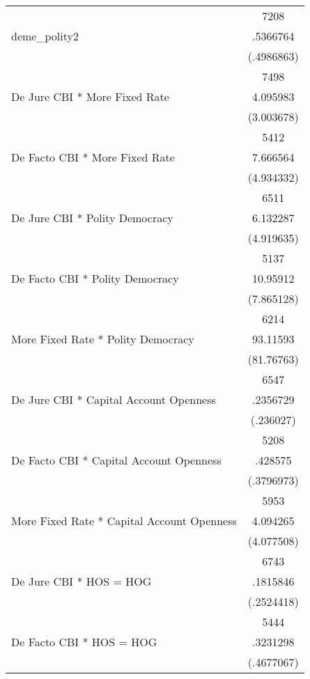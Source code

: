 {\begin{longtable}{l*{1}{c}}
                    &        7208\\
deme\_polity2        &    .5366764\\
                    &  (.4986863)\\
                    &        7498\\
De Jure CBI * More Fixed Rate&    4.095983\\
                    &  (3.003678)\\
                    &        5412\\
De Facto CBI * More Fixed Rate&    7.666564\\
                    &  (4.934332)\\
                    &        6511\\
De Jure CBI * Polity Democracy&    6.132287\\
                    &  (4.919635)\\
                    &        5137\\
De Facto CBI * Polity Democracy&    10.95912\\
                    &  (7.865128)\\
                    &        6214\\
More Fixed Rate * Polity Democracy&    93.11593\\
                    &  (81.76763)\\
                    &        6547\\
De Jure CBI * Capital Account Openness&    .2356729\\
                    &   (.236027)\\
                    &        5208\\
De Facto CBI * Capital Account Openness&     .428575\\
                    &  (.3796973)\\
                    &        5953\\
More Fixed Rate * Capital Account Openness&    4.094265\\
                    &  (4.077508)\\
                    &        6743\\
De Jure CBI * HOS = HOG&    .1815846\\
                    &  (.2524418)\\
                    &        5444\\
De Facto CBI * HOS = HOG&    .3231298\\
                    &  (.4677067)\\

\end{longtable}}
